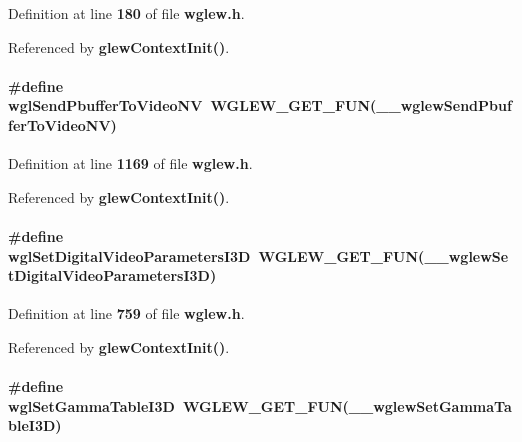 Definition at line {\bf 180} of file {\bf wglew.\+h}.



Referenced by {\bf glew\+Context\+Init()}.

\paragraph[{wgl\+Send\+Pbuffer\+To\+Video\+NV}]{\setlength{\rightskip}{0pt plus 5cm}\#define wgl\+Send\+Pbuffer\+To\+Video\+NV~{\bf W\+G\+L\+E\+W\+\_\+\+G\+E\+T\+\_\+\+F\+UN}({\bf \+\_\+\+\_\+wglew\+Send\+Pbuffer\+To\+Video\+NV})}\label{wglew_8h_a4244c7d1e9f9f580e3f3eb0d3ae2d34e}


Definition at line {\bf 1169} of file {\bf wglew.\+h}.



Referenced by {\bf glew\+Context\+Init()}.

\paragraph[{wgl\+Set\+Digital\+Video\+Parameters\+I3D}]{\setlength{\rightskip}{0pt plus 5cm}\#define wgl\+Set\+Digital\+Video\+Parameters\+I3D~{\bf W\+G\+L\+E\+W\+\_\+\+G\+E\+T\+\_\+\+F\+UN}({\bf \+\_\+\+\_\+wglew\+Set\+Digital\+Video\+Parameters\+I3D})}\label{wglew_8h_a1b660e16d64f8bf45fc2e8f877bb0e61}


Definition at line {\bf 759} of file {\bf wglew.\+h}.



Referenced by {\bf glew\+Context\+Init()}.

\paragraph[{wgl\+Set\+Gamma\+Table\+I3D}]{\setlength{\rightskip}{0pt plus 5cm}\#define wgl\+Set\+Gamma\+Table\+I3D~{\bf W\+G\+L\+E\+W\+\_\+\+G\+E\+T\+\_\+\+F\+UN}({\bf \+\_\+\+\_\+wglew\+Set\+Gamma\+Table\+I3D})}\label{wglew_8h_a49555726b79c6860c87dfa53c318f9ec}


